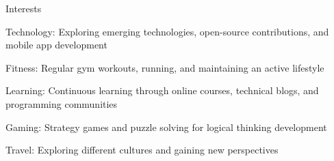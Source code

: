 \begin{resume_section}{Interests}
    \begin{subitems}
        \item Technology: Exploring emerging technologies, open-source contributions, and mobile app development
        \item Fitness: Regular gym workouts, running, and maintaining an active lifestyle
        \item Learning: Continuous learning through online courses, technical blogs, and programming communities
        \item Gaming: Strategy games and puzzle solving for logical thinking development
        \item Travel: Exploring different cultures and gaining new perspectives
    \end{subitems}
\end{resume_section}

